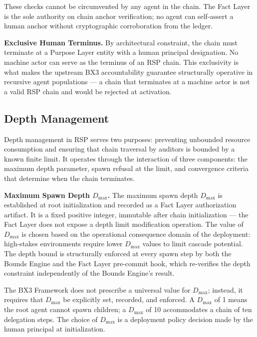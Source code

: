These checks cannot be circumvented by any agent in the chain. The Fact Layer is the sole authority on chain anchor verification; no agent can self-assert a human anchor without cryptographic corroboration from the ledger.

\medskip
\noindent\textbf{Exclusive Human Terminus.} By architectural constraint, the chain must terminate at a Purpose Layer entity with a human principal designation. No machine actor can serve as the terminus of an RSP chain. This exclusivity is what makes the upstream BX3 accountability guarantee structurally operative in recursive agent populations — a chain that terminates at a machine actor is not a valid RSP chain and would be rejected at activation.

\subsection{Depth Management}
\label{sec:depth-management}

Depth management in RSP serves two purposes: preventing unbounded resource consumption and ensuring that chain traversal by auditors is bounded by a known finite limit. It operates through the interaction of three components: the maximum depth parameter, spawn refusal at the limit, and convergence criteria that determine when the chain terminates.

\medskip
\noindent\textbf{Maximum Spawn Depth $D_{\max}$.} The maximum spawn depth $D_{\max}$ is established at root initialization and recorded as a Fact Layer authorization artifact. It is a fixed positive integer, immutable after chain initialization — the Fact Layer does not expose a depth limit modification operation. The value of $D_{\max}$ is chosen based on the operational consequence domain of the deployment: high-stakes environments require lower $D_{\max}$ values to limit cascade potential. The depth bound is structurally enforced at every spawn step by both the Bounds Engine and the Fact Layer pre-commit hook, which re-verifies the depth constraint independently of the Bounds Engine's result.

The BX3 Framework does not prescribe a universal value for $D_{\max}$; instead, it requires that $D_{\max}$ be explicitly set, recorded, and enforced. A $D_{\max}$ of 1 means the root agent cannot spawn children; a $D_{\max}$ of 10 accommodates a chain of ten delegation steps. The choice of $D_{\max}$ is a deployment policy decision made by the human principal at initialization.

